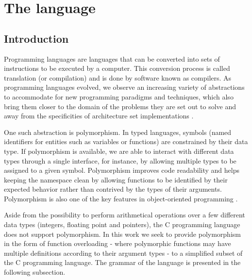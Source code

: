 \section{The language}
\subsection{Introduction}
Programming languages are languages that can be converted into sets of instructions to be
executed by a computer. This conversion process is called translation (or compilation) and
is done by software known as compilers. As programming languages evolved, we observe an
increasing variety of abstractions to accommodate for new programming paradigms and
techniques, which also bring them closer to the domain of the problems they are set
out to solve and away from the specificities of architecture set implementations \cite{Aho2007}.

One such abstraction is polymorphism. In typed languages, symbols (named identifiers
for entities such as variables or functions) are constrained by their data type.
If polymorphism is available, we are able to interact with different data types
through a single interface, for instance, by allowing multiple types to be assigned
to a given symbol. Polymorphism improves code readability and helps keeping the namespace
clean by allowing functions to be identified by their expected behavior rather than
contrived by the types of their arguments. Polymorphism is also one of the key features
in object-oriented programming \cite{Aho2007, Strachey2000}.

Aside from the possibility to perform arithmetical operations over a few different
data types (integers, floating point and pointers), the C programming language does
not support polymorphism. In this work we seek to provide polymorphism in the form
of function overloading - where polymorphic functions may have multiple definitions
according to their argument types - to a simplified subset of the C programming language.
The grammar of the language is presented in the following subsection.

